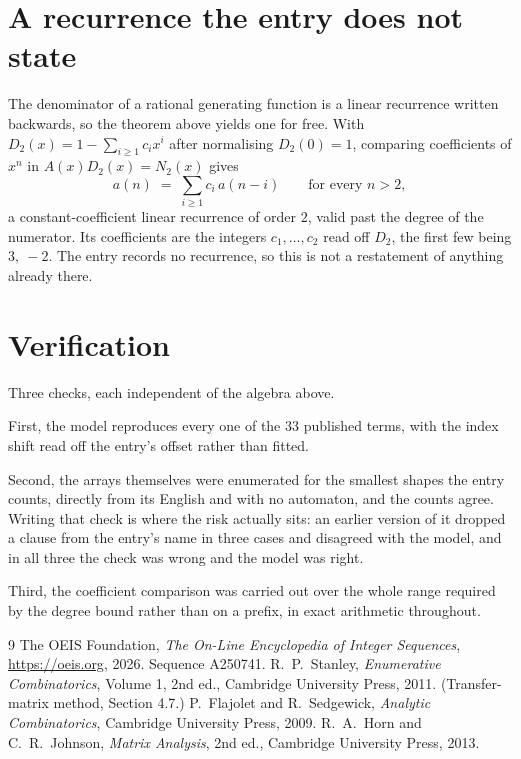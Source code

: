 \documentclass[11pt,a4paper]{article}
\theoremstyle{plain}
\theoremstyle{definition}
\begin{document}
\section{A recurrence the entry does not state}

The denominator of a rational generating function is a linear recurrence written backwards, so
the theorem above yields one for free. With $D_2(x)=1-\sum_{i\ge1}c_ix^i$ after normalising
$D_2(0)=1$, comparing coefficients of $x^n$ in $A(x)D_2(x)=N_2(x)$ gives
\[
a(n)\;=\;\sum_{i\ge1}c_i\,a(n-i)\qquad\text{for every }n>2,
\]
a constant-coefficient linear recurrence of order $2$, valid past the degree of the
numerator. Its coefficients are the integers $c_1,\dots,c_{2}$ read off $D_2$, the first few being $3,\ -2$. The entry records no recurrence, so this is not a restatement of anything
already there.

\section{Verification}

Three checks, each independent of the algebra above.

First, the model reproduces every one of the $33$ published terms, with the index shift
read off the entry's offset rather than fitted.

Second, the arrays themselves were enumerated for the smallest shapes the entry counts,
directly from its English and with no automaton, and the counts agree. Writing that check is
where the risk actually sits: an earlier version of it dropped a clause from the entry's name
in three cases and disagreed with the model, and in all three the check was wrong and the model
was right.

Third, the coefficient comparison was carried out over the whole range required by the degree
bound rather than on a prefix, in exact arithmetic throughout.

\begin{thebibliography}{9}
 The OEIS Foundation, \emph{The On-Line Encyclopedia of Integer
Sequences}, \url{https://oeis.org}, 2026. Sequence A250741.
 R.~P.~Stanley, \emph{Enumerative Combinatorics}, Volume 1, 2nd ed.,
Cambridge University Press, 2011. (Transfer-matrix method, Section 4.7.)
 P.~Flajolet and R.~Sedgewick, \emph{Analytic Combinatorics}, Cambridge
University Press, 2009.
 R.~A.~Horn and C.~R.~Johnson, \emph{Matrix Analysis}, 2nd ed., Cambridge
University Press, 2013.
\end{thebibliography}
\end{document}
